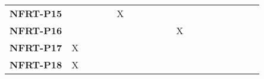 \documentclass[12pt, titlepage]{article}
\begin{document}
\begin{landscape}
\begin{longtable}{|l|ccccccccccccc|}
		\textbf{NFRT-P15} & ~                                                         & ~             & ~             & X             & ~             & ~             & ~             & ~             & ~             & ~             & ~ & ~ & ~\\
		\textbf{NFRT-P16} & ~                                                         & ~             & ~             & ~             & ~             & ~             & ~             & X             & ~             & ~             & ~ & ~ & ~\\
		\textbf{NFRT-P17} & X                                                         & ~             & ~             & ~             & ~             & ~             & ~             & ~             & ~             & ~             & ~             & ~             & ~\\
		\textbf{NFRT-P18} & X                                                         & ~             & ~             & ~             & ~             & ~             & ~             & ~             & ~             & ~             & ~             & ~             & ~\\
		\hline
	\end{longtable}

	\newpage
	

\end{landscape}
\end{document}

